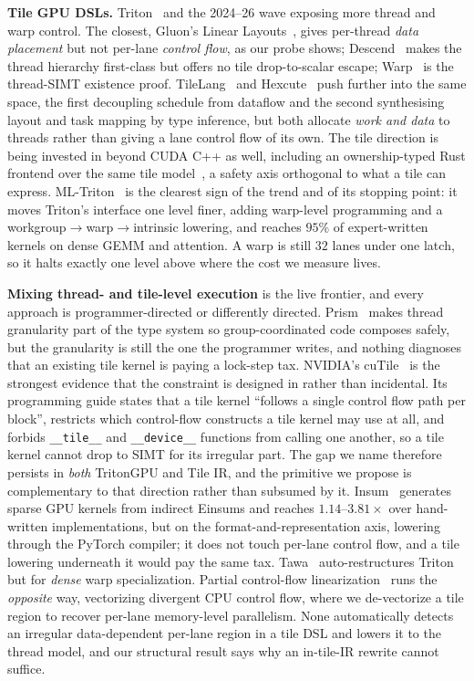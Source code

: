 \documentclass[sigplan,screen,review,anonymous]{acmart}
\begin{document}
\textbf{Tile GPU DSLs.} Triton~\cite{triton2019} and the 2024--26 wave exposing more
thread and warp control. The closest, Gluon's Linear Layouts~\cite{linearlayouts2025},
gives per-thread \emph{data placement} but not per-lane \emph{control flow}, as our probe
shows; Descend~\cite{descend2024} makes the thread hierarchy first-class but offers no tile
drop-to-scalar escape; Warp~\cite{warp2022} is the thread-SIMT existence proof. TileLang~\cite{tilelang2025} and Hexcute~\cite{hexcute2025} push further into the same
space, the first decoupling schedule from dataflow and the second synthesising layout and
task mapping by type inference, but both allocate \emph{work and data} to threads rather
than giving a lane control flow of its own. The tile direction is being invested in beyond
CUDA C++ as well, including an ownership-typed Rust frontend over the same tile
model~\cite{fearless2026}, a safety axis orthogonal to what a tile can express.
ML-Triton~\cite{mltriton2025} is the clearest sign of the trend and of its stopping point:
it moves Triton's interface one level finer, adding warp-level programming and a
workgroup$\rightarrow$warp$\rightarrow$intrinsic lowering, and reaches $95\%$ of
expert-written kernels on dense GEMM and attention. A warp is still $32$ lanes under one
latch, so it halts exactly one level above where the cost we measure lives.

\textbf{Mixing thread- and tile-level execution} is the live frontier, and every approach
is programmer-directed or differently directed. Prism~\cite{prism2026} makes thread
granularity part of the type system so group-coordinated code composes safely, but the
granularity is still the one the programmer writes, and nothing diagnoses that an existing
tile kernel is paying a lock-step tax. NVIDIA's cuTile~\cite{cutile2025} is the strongest
evidence that the constraint is designed in rather than incidental. Its programming guide
states that a tile kernel ``follows a single control flow path per block'', restricts which
control-flow constructs a tile kernel may use at all, and forbids \texttt{\_\_tile\_\_}
and \texttt{\_\_device\_\_} functions from calling one another, so a tile kernel cannot
drop to SIMT for its irregular part. The gap we name therefore persists in \emph{both}
TritonGPU and Tile IR, and the primitive we propose is complementary to that direction
rather than subsumed by it. Insum~\cite{insum2026} generates sparse GPU kernels from
indirect Einsums and reaches $1.14$--$3.81\times$ over hand-written implementations, but on
the format-and-representation axis, lowering through the PyTorch compiler; it does not touch
per-lane control flow, and a tile lowering underneath it would pay the same tax. Tawa~\cite{tawa2026} auto-restructures Triton but for \emph{dense} warp
specialization. Partial control-flow linearization~\cite{partialcfg2018} runs the
\emph{opposite} way, vectorizing divergent CPU control flow, where we de-vectorize a tile
region to recover per-lane memory-level parallelism. None automatically detects an
irregular data-dependent per-lane region in a tile DSL and lowers it to the thread model,
and our structural result says why an in-tile-IR rewrite cannot suffice.
\end{document}
